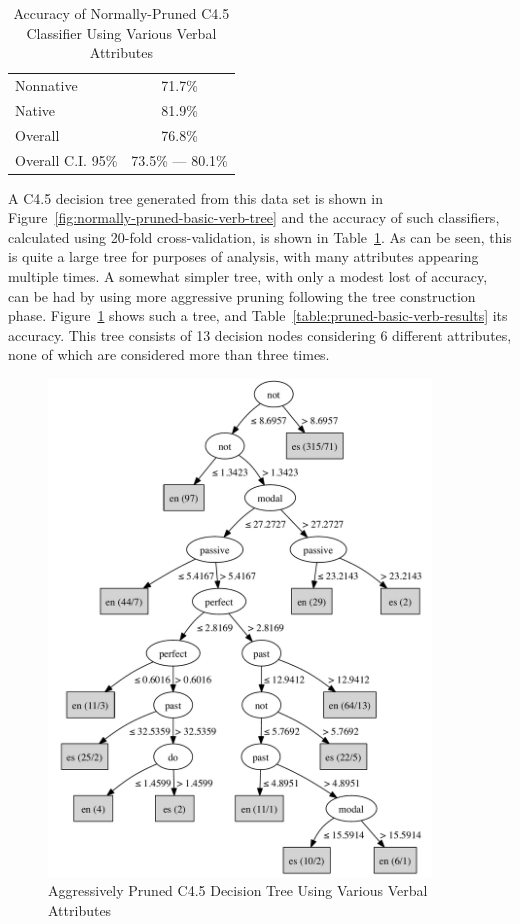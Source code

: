 \documentclass[main.tex]{subfiles}
\begin{document}
\begin{table}[htbp]
\centering
\caption{Accuracy of Normally-Pruned C4.5 Classifier Using Various Verbal Attributes}
\begin{tabular}{l c}
\toprule
Nonnative & 71.7\% \\
Native & 81.9\% \\
Overall & 76.8\% \\
Overall C.I. 95\% & 73.5\% --- 80.1\%\\
\bottomrule
\end{tabular}
\label{table:normally-pruned-basic-verb-results}
\end{table}

A C4.5 decision tree generated from this data set is shown in Figure~\ref{fig:normally-pruned-basic-verb-tree} and the accuracy of such classifiers, calculated using 20-fold cross-validation, is shown in Table~\ref{table:normally-pruned-basic-verb-results}. As can be seen, this is quite a large tree for purposes of analysis, with many attributes appearing multiple times. A somewhat simpler tree, with only a modest lost of accuracy, can be had by using more aggressive pruning following the tree construction phase. Figure~\ref{fig:pruned-basic-verb-tree} shows such a tree, and Table~\ref{table:pruned-basic-verb-results} its accuracy. This tree consists of 13 decision nodes considering 6 different attributes, none of which are considered more than three times.
\begin{figure}[htbp]
\centering
\includegraphics[width=4in]{pruned-basic-verb-tree.pdf}
\caption{Aggressively Pruned C4.5 Decision Tree Using Various Verbal Attributes}
\label{fig:pruned-basic-verb-tree}
\end{figure}
\end{document}
